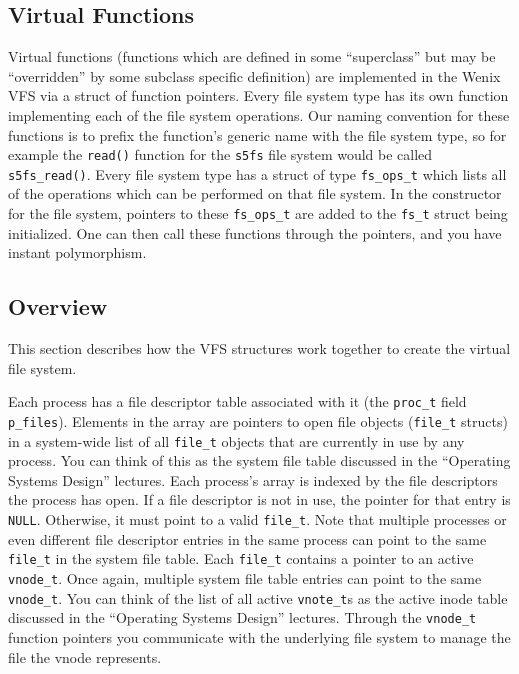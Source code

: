 \subsection{Virtual Functions}

Virtual functions (functions which are defined in some ``superclass'' but may be ``overridden'' by some subclass specific definition) are implemented in the Wenix VFS via a struct of function pointers. Every file system type has its own function implementing each of the file system operations. Our naming convention for these functions is to prefix the function's generic name with the file system type, so for example the \texttt{read()} function for the \texttt{s5fs} file system would be called \texttt{s5fs\_read()}. Every file system type has a struct of type \texttt{fs\_ops\_t} which lists all of the operations which can be performed on that file system. In the constructor for the file system, pointers to these \texttt{fs\_ops\_t} are added to the \texttt{fs\_t} struct being initialized. One can then call these functions through the pointers, and you have instant polymorphism.

\subsection{Overview}

This section describes how the VFS structures work together to create the virtual file system.

Each process has a file descriptor table associated with it (the \texttt{proc\_t} field \texttt{p\_files}). Elements in the array are pointers to open file objects (\texttt{file\_t} structs) in a system-wide list of all \texttt{file\_t} objects that are currently in use by any process. You can think of this as the system file table discussed in the ``Operating Systems Design'' lectures.
Each process's array is indexed by the file descriptors the process has open. If a file descriptor is not in use, the pointer for that entry is \texttt{NULL}. Otherwise, it must point to a valid \texttt{file\_t}. Note that multiple processes or even different file descriptor entries in the same process can point to the same \texttt{file\_t} in the system file table. Each \texttt{file\_t} contains a pointer to an active \texttt{vnode\_t}. Once again, multiple system file table entries can point to the same \texttt{vnode\_t}. You can think of the list of all active \texttt{vnote\_t}s as the active inode table discussed in the ``Operating Systems Design'' lectures.
Through the \texttt{vnode\_t} function pointers you communicate with the underlying file system to manage the file the vnode represents.


